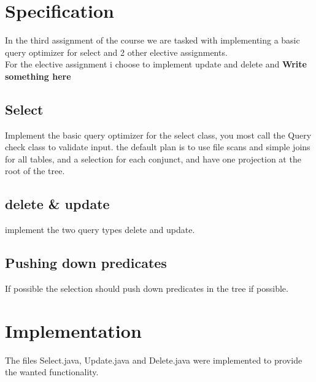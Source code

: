 \documentclass[a4paper,10pt,titlepage]{report}
\begin{document}
\section{Specification}
In the third assignment of the course we are tasked with implementing a basic query optimizer for select and 2 other elective assignments.\\

For the elective assignment i choose to implement update and delete and \textbf{Write something here}


\subsection{Select}
Implement the basic query optimizer for the select class, you most call the Query check class to validate input. the default plan is to use file scans and simple joins for all tables, and a selection for each conjunct, and have one projection at the root of the tree.

\subsection{delete \& update }

implement the two query types delete and update.

\subsection{Pushing down predicates}
If possible the selection should push down predicates in the tree if possible.



%

\section{Implementation}
The files \textsf{Select.java}, \textsf{Update.java} and \textsf{Delete.java} were implemented to provide the wanted functionality.
\end{document}
